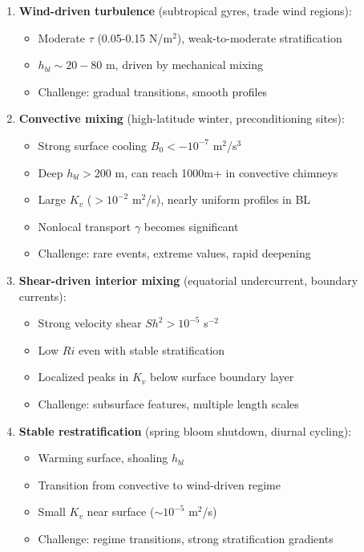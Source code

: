 \documentclass[11pt, a4paper]{article}
\begin{document}
\begin{enumerate}
    \item \textbf{Wind-driven turbulence} (subtropical gyres, trade wind regions):
    \begin{itemize}
        \item Moderate $\tau$ (0.05-0.15 N/m$^2$), weak-to-moderate stratification
        \item $h_{bl} \sim 20-80$ m, driven by mechanical mixing
        \item Challenge: gradual transitions, smooth profiles
    \end{itemize}

    \item \textbf{Convective mixing} (high-latitude winter, preconditioning sites):
    \begin{itemize}
        \item Strong surface cooling $B_0 < -10^{-7}$ m$^2$/s$^3$
        \item Deep $h_{bl} > 200$ m, can reach 1000m+ in convective chimneys
        \item Large $K_v$ ($>10^{-2}$ m$^2$/s), nearly uniform profiles in BL
        \item Nonlocal transport $\gamma$ becomes significant
        \item Challenge: rare events, extreme values, rapid deepening
    \end{itemize}

    \item \textbf{Shear-driven interior mixing} (equatorial undercurrent, boundary currents):
    \begin{itemize}
        \item Strong velocity shear $Sh^2 > 10^{-5}$ s$^{-2}$
        \item Low $Ri$ even with stable stratification
        \item Localized peaks in $K_v$ below surface boundary layer
        \item Challenge: subsurface features, multiple length scales
    \end{itemize}

    \item \textbf{Stable restratification} (spring bloom shutdown, diurnal cycling):
    \begin{itemize}
        \item Warming surface, shoaling $h_{bl}$
        \item Transition from convective to wind-driven regime
        \item Small $K_v$ near surface ($\sim 10^{-5}$ m$^2$/s)
        \item Challenge: regime transitions, strong stratification gradients
    \end{itemize}


\end{enumerate}
\end{document}
